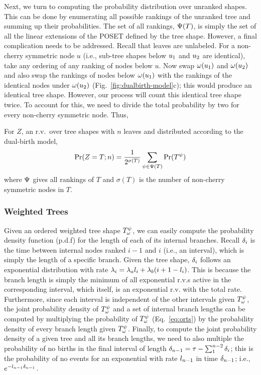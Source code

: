 Next, we turn to computing the probability distribution over unranked shapes. This can be done by enumerating all possible rankings of the unranked tree and summing up their probabilities. The set of all rankings, $\Psi(T)$, is simply the set of all the linear extensions of the \gls{POSET} defined by the tree shape. However, a final complication needs to be addressed. Recall that leaves are unlabeled. For a non-cherry symmetric node $u$ (i.e., sub-tree shapes below $u_{1}$ and $u_{2}$ are identical), take any ordering of any ranking of nodes below $u$. Now swap $\omega(u_{1})$ and  $\omega(u_{2})$ and also swap the rankings of nodes below $\omega(u_{1})$ with the rankings of the identical nodes under $\omega(u_{2})$ (Fig.~\ref{fig:dualbirth-model}c); this would produce an identical tree shape. However, our process will count this identical tree shape twice. To account for this, we need to divide the total probability by two for every non-cherry symmetric node. Thus,
\begin{corollary}
For $Z$, an r.v.\ over tree shapes with $n$ leaves and distributed according to the dual-birth model,
\begin{equation}\label{eq:rt}
\Pr(Z=T;n) = \frac{1}{2^{\sigma(T)}}\sum_{\psi\in\Psi(T)} \Pr(T^\psi)
\end{equation}
where $\Psi$ gives all rankings of $T$ and $\sigma(T)$ is the number of non-cherry symmetric nodes in $T$.
\end{corollary}

\subsubsection{Weighted Trees}
Given an ordered weighted tree shape $T^\psi_{\omega}$, we can easily compute the probability density function (p.d.f) for the length of each of its internal branches. Recall $\delta_i$ is the time between internal nodes ranked $i-1$ and $i$ (i.e., an interval), which is simply the length of a specific branch. Given the tree shape, $\delta_i$  follows an exponential distribution with rate $\lambda_i=\lambda_al_{i}+\lambda_b(i+1-l_{i})$. This is because the branch length is simply the  minimum of all exponential r.v.s active in the corresponding interval, which itself, is an exponential r.v. with the total rate. Furthermore, since each interval is independent of the other intervals given $T^\psi_{\omega}$, the joint probability density of $T^\psi_{\omega}$ and a set of internal branch lengths can be computed by multiplying the probability of $T^\psi_{\omega}$ (Eq.~\ref{eq:orts}) by the probability density of every branch length given $T^\psi_{\omega}$. Finally, to compute the joint probability density of a given tree and all its branch lengths, we need to also multiple the probability of no births in the final interval of length $\delta_{n-1}=\tau-\sum_1^{n-2}\delta_{i}$; this is the probability of no events for an exponential with rate $l_{n-1}$ in time $\delta_{n-1}$; i.e., $e^{-l_{n-1}\delta_{n-1}}$.

